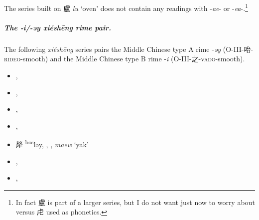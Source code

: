 The series built on {\large{盧}} \textit{lu} `oven' does not contain any readings with -\textit{ae}- or -\textit{ea}-.\footnote{In fact 盧 is part of a larger series, but I do not want just now to worry about  versus 虍 used as phonetics.}

\subparagraph{The -\textit{i}/-\textit{əy} \textit{xiéshēng} rime pair.}
\label{subpar:i-əy-XS-pair}
The following \textit{xiéshēng} series pairs the Middle Chinese type A rime -\textit{əy} (O-III-咍-\textsc{rideo}-smooth) and the Middle Chinese type B rime -\textit{i} (O-III-之-\textsc{vado}-smooth).


\begin{itemize}
    \item {} %
    {},
    {}            %

    \item {} %
    {},
    {}            %

    \item {} %
    {},
    {}            %

    \item {} %
    {},
    {}            %

    \item {\Large{犛}} %
    {\large{{\textsuperscript{bos}}ləy}},
    {}, {}, 
    \textit{maew} `yak'     %

   
    \item {} %
    {},
    {}            %

\item {} %
{},
{}           %
\end{itemize}


